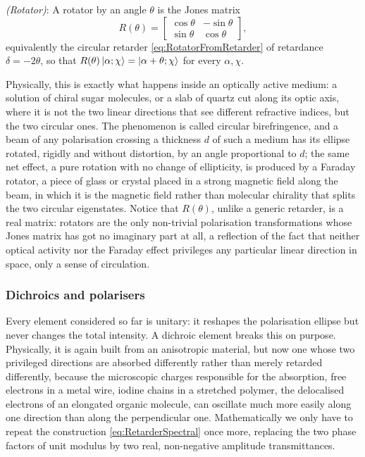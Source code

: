             \begin{myDef}
                \textit{(Rotator)}: A rotator by an angle $\theta$ is the Jones matrix
                \begin{equation}\label{eq:RotatorMatrix}
                    R(\theta) = \begin{bmatrix}\cos\theta & -\sin\theta\\ \sin\theta & \cos\theta\end{bmatrix},
                \end{equation}
                equivalently the circular retarder \ref{eq:RotatorFromRetarder} of retardance $\delta=-2\theta$, so that $R(\theta)\ket{\alpha;\chi}=\ket{\alpha+\theta;\chi}$ for every $\alpha,\chi$.
            \end{myDef}

            Physically, this is exactly what happens inside an optically active medium: a solution of chiral sugar molecules, or a slab of quartz cut along its optic axis, where it is not the two linear directions that see different refractive indices, but the two circular ones. The phenomenon is called circular birefringence, and a beam of any polarisation crossing a thickness $d$ of such a medium has its ellipse rotated, rigidly and without distortion, by an angle proportional to $d$; the same net effect, a pure rotation with no change of ellipticity, is produced by a Faraday rotator, a piece of glass or crystal placed in a strong magnetic field along the beam, in which it is the magnetic field rather than molecular chirality that splits the two circular eigenstates. Notice that $R(\theta)$, unlike a generic retarder, is a real matrix: rotators are the only non-trivial polarisation transformations whose Jones matrix has got no imaginary part at all, a reflection of the fact that neither optical activity nor the Faraday effect privileges any particular linear direction in space, only a sense of circulation.

        \subsubsection{Dichroics and polarisers}

            Every element considered so far is unitary: it reshapes the polarisation ellipse but never changes the total intensity. A dichroic element breaks this on purpose. Physically, it is again built from an anisotropic material, but now one whose two privileged directions are absorbed differently rather than merely retarded differently, because the microscopic charges responsible for the absorption, free electrons in a metal wire, iodine chains in a stretched polymer, the delocalised electrons of an elongated organic molecule, can oscillate much more easily along one direction than along the perpendicular one. Mathematically we only have to repeat the construction \ref{eq:RetarderSpectral} once more, replacing the two phase factors of unit modulus by two real, non-negative amplitude transmittances.

